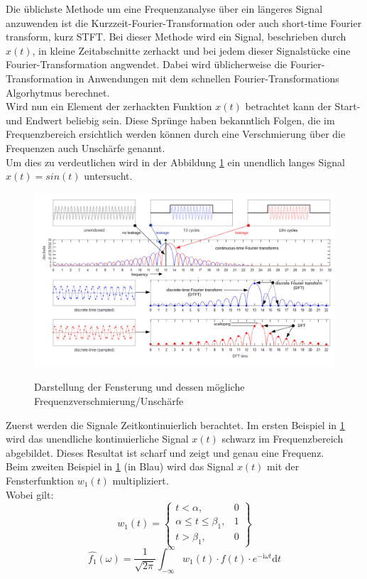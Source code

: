 
Die üblichste Methode um eine Frequenzanalyse über ein längeres Signal anzuwenden ist die  Kurzzeit-Fourier-Transformation oder auch short-time Fourier transform, kurz STFT. Bei dieser Methode wird ein Signal, beschrieben durch $x(t)$, in kleine Zeitabschnitte zerhackt und bei jedem dieser Signalstücke eine Fourier-Transformation angwendet. Dabei wird üblicherweise die Fourier-Transformation in Anwendungen mit dem schnellen Fourier-Transformations Algorhytmus berechnet.\\

Wird nun ein Element der zerhackten Funktion $x(t)$ betrachtet kann der Start- und Endwert beliebig sein. Diese Sprünge haben bekanntlich Folgen, die im Frequenzbereich ersichtlich werden können durch eine Verschmierung über die Frequenzen auch Unschärfe genannt. \\

Um dies zu verdeutlichen wird in der Abbildung \ref{fig:Spectral} ein unendlich langes Signal $x(t)=sin(t)$ untersucht. 
\begin{figure}[!ht]
	\centering
	\includegraphics[scale=0.8]{papers/autotune/sections/fft/images/windows/Spectral.pdf}
	\caption{Darstellung der Fensterung und dessen mögliche Frequenzverschmierung/Unschärfe}\cite{wikipedia:Window}
	\label{fig:Spectral}
\end{figure}%

Zuerst werden die Signale Zeitkontinuierlich berachtet. Im ersten Beispiel in \ref{fig:Spectral} wird das unendliche kontinuierliche Signal $x(t)$ schwarz im Frequenzbereich abgebildet. Dieses Resultat ist scharf und zeigt und genau eine Frequenz.\\

Beim zweiten Beispiel in \ref{fig:Spectral} (in Blau) wird das Signal $x(t)$ mit der Fensterfunktion $w_{1}(t)$ multipliziert.\\
Wobei gilt: 
\begin{equation}
	w_{1}(t)= \left\{\begin{array}{lll}{t<\alpha,} & {0} \\ {\alpha\leq t \leq\beta_{1},} & {1}\\ {t>\beta_{1},}&{0}\end{array}\right\}
\end{equation}
\begin{equation}
	\hat{f_{1}}(\omega)=\frac{1}{\sqrt{2 \pi}} \int_{-\infty}^{\infty} w_{1}(t)\cdot f(t) \cdot e^{-\mathrm{i} \omega t} \mathrm{d} t
\end{equation}

